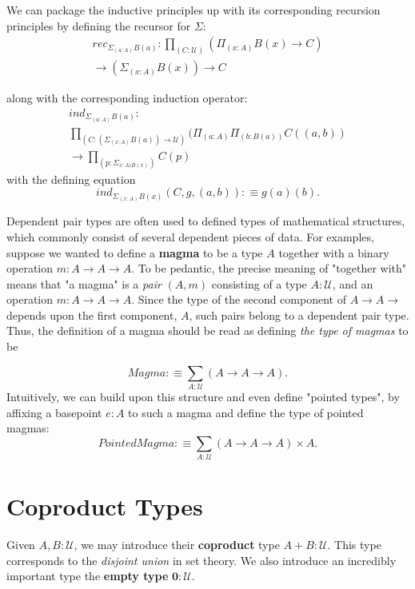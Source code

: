 \documentclass[letterpaper, 10 pt, conference]{ieeeconf}  %
\begin{document}
We can package the inductive principles up with its corresponding recursion principles by defining the recursor for $\Sigma$:
\begin{multline}
    rec_{\Sigma_{(a:A)} B(a)} :  \prod_{(C: \mathcal{U})} (\Pi_{(x:A)} B(x) \rightarrow C) \\ \rightarrow  (\Sigma_{(x:A)} B(x)) \rightarrow C
\end{multline}

along with the corresponding induction operator:
\begin{multline}
    ind_{\Sigma_{(a:A)} B(a)} : \\ \prod_{(C: (\Sigma_{(x:A)} B(a)) \rightarrow \mathcal{U})} (\Pi_{(a:A)} \Pi_{(b:B(a))} C((a,b)) \\ \rightarrow \prod_{(p: \Sigma_{x:A) B(x)})} C(p)
\end{multline}
with the defining equation
\begin{equation}
    ind_{\Sigma_{(x:A)} B(x)} (C, g,(a,b)) :\equiv g(a)(b).
\end{equation}

Dependent pair types are often used to defined types of mathematical structures, which commonly consist of several dependent pieces of data. For examples, suppose we wanted to define a \textbf{magma} to be a type $A$ together with a binary operation $m : A \rightarrow A \rightarrow A$. To be pedantic, the precise meaning of "together with" means that "a magma" is a \textit{pair} $(A,m)$ consisting of a type $A: \mathcal{U}$, and an operation $m : A \rightarrow A \rightarrow A$. Since the type of the second component of $A \rightarrow A \rightarrow $ depends upon the first component, $A$, such pairs belong to a dependent pair type. Thus, the definition of a magma should be read as defining \textit{the type of magmas} to be

\begin{equation*}
    Magma :\equiv \sum_{A:\mathcal{U}}(A \rightarrow A \rightarrow A).
\end{equation*}
Intuitively, we can build upon this structure and even define "pointed types", by affixing a basepoint $e:A$ to such a magma and define the type of pointed magmas:
\begin{equation}
    PointedMagma :\equiv \sum_{A:\mathcal{U}} (A \rightarrow A \rightarrow A) \times A.
\end{equation}

\section{Coproduct Types}
Given $A,B : \mathcal{U}$, we may introduce their \textbf{coproduct} type $A + B : \mathcal{U}$. This type corresponds to the \textit{disjoint union} in set theory. We also introduce an incredibly important type the \textbf{empty type} $\mathbf{0} : \mathcal{U}$.
\end{document}

